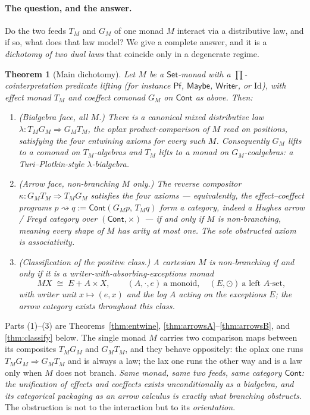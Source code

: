 \documentclass[11pt]{amsart}
\theoremstyle{plain}
\newtheorem{theorem}{Theorem}[section]
\theoremstyle{definition}
\theoremstyle{remark}
\newcommand{\Set}{\mathsf{Set}}
\newcommand{\Cont}{\mathsf{Cont}}
\newcommand{\Maybe}{\mathsf{Maybe}}
\newcommand{\Pf}{\mathsf{Pf}}
\newcommand{\Writer}{\mathsf{Writer}}
\begin{document}
\paragraph{The question, and the answer.}
Do the two feeds $T_M$ and $G_M$ of one monad $M$ interact via a distributive law, and if
so, what does that law model? We give a complete answer, and it is a \emph{dichotomy of two
dual laws} that coincide only in a degenerate regime.

\begin{theorem}[Main dichotomy]\label{thm:main}
Let $M$ be a $\Set$-monad with a $\prod$-cointerpretation predicate lifting (for instance
$\Pf$, $\Maybe$, $\Writer$, or $\mathrm{Id}$), with effect monad $T_M$ and coeffect comonad
$G_M$ on $\Cont$ as above. Then:
\begin{enumerate}
  \item \emph{(Bialgebra face, all $M$.)} There is a canonical mixed distributive law
  $\lambda\colon T_M G_M \Rightarrow G_M T_M$, the oplax product-comparison of $M$ read on
  positions, satisfying the four entwining axioms for \emph{every} such $M$. Consequently
  $G_M$ lifts to a comonad on $T_M$-algebras and $T_M$ lifts to a monad on
  $G_M$-coalgebras: a Turi--Plotkin-style $\lambda$-bialgebra.
  \item \emph{(Arrow face, non-branching $M$ only.)} The reverse compositor
  $\kappa\colon G_M T_M \Rightarrow T_M G_M$ satisfies the four axioms --- equivalently, the
  effect--coeffect programs $p\rightsquigarrow q := \Cont(G_M p,\,T_M q)$ form a category,
  indeed a Hughes arrow / Freyd category over $(\Cont,\times)$ --- \emph{if and only if $M$
  is non-branching}, meaning every shape of $M$ has arity at most one. The sole obstructed
  axiom is associativity.
  \item \emph{(Classification of the positive class.)} A cartesian $M$ is non-branching if
  and only if it is a \emph{writer-with-absorbing-exceptions} monad
  \[
    MX \;\cong\; E + A\times X,\qquad (A,\cdot,e)\ \text{a monoid},\quad
    (E,\odot)\ \text{a left $A$-set},
  \]
  with writer unit $x\mapsto(e,x)$ and the log $A$ acting on the exceptions $E$; the arrow
  category exists throughout this class.
\end{enumerate}
\end{theorem}

Parts (1)--(3) are Theorems~\ref{thm:entwine}, \ref{thm:arrowsA}--\ref{thm:arrowsB}, and
\ref{thm:classify} below. The single monad $M$ carries two comparison maps between its
composites $T_M G_M$ and $G_M T_M$, and they behave oppositely: the oplax one runs
$T_M G_M \Rightarrow G_M T_M$ and is always a law; the lax one runs the other way and is a
law only when $M$ does not branch. \emph{Same monad, same two feeds, same category $\Cont$:
the unification of effects and coeffects exists unconditionally as a bialgebra, and its
categorical packaging as an arrow calculus is exactly what branching obstructs.} The
obstruction is not to the interaction but to its \emph{orientation}.
\end{document}
